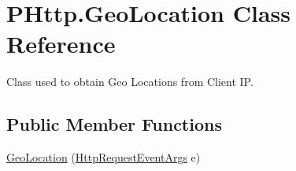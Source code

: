 \hypertarget{class_p_http_1_1_geo_location}{}\section{P\+Http.\+Geo\+Location Class Reference}
\label{class_p_http_1_1_geo_location}


Class used to obtain Geo Locations from Client IP.  


\subsection*{Public Member Functions}
\begin{DoxyCompactItemize}
\item 
\hyperlink{class_p_http_1_1_geo_location_a42c10ed14e482794a93247fb3fb700e4}{Geo\+Location} (\hyperlink{class_p_http_1_1_http_request_event_args}{Http\+Request\+Event\+Args} e)
\end{DoxyCompactItemize}
